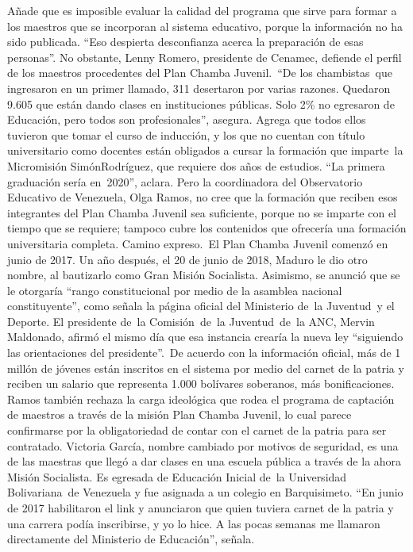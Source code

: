 \documentclass{article}%
\begin{document}
%
Añade que es imposible evaluar la calidad del programa que sirve para formar a los maestros que se incorporan al sistema educativo, porque la información no ha sido publicada. “Eso despierta desconfianza acerca la preparación de esas personas”.%
\newline%
%
No obstante, Lenny Romero, presidente de Cenamec, defiende el perfil de los maestros procedentes del Plan Chamba Juvenil.~“De los chambistas~que ingresaron en un primer llamado, 311 desertaron por varias razones. Quedaron 9.605 que están dando clases en instituciones públicas. Solo 2\% no egresaron de Educación, pero todos son profesionales”, asegura.%
\newline%
%
Agrega que todos ellos tuvieron que tomar el curso de inducción, y los que no cuentan con título universitario como docentes están obligados a cursar la formación que imparte~la Micromisión SimónRodríguez, que requiere dos años de estudios. “La primera graduación sería en~2020”, aclara.%
\newline%
%
Pero la coordinadora del Observatorio Educativo de Venezuela, Olga Ramos, no cree que la formación que reciben esos integrantes del Plan Chamba Juvenil sea suficiente, porque no se imparte con el tiempo que se requiere; tampoco cubre los contenidos que ofrecería una formación universitaria completa.%
\newline%
%
Camino expreso.~El Plan Chamba Juvenil comenzó en junio de 2017. Un año después, el 20 de junio de 2018, Maduro le dio otro nombre, al bautizarlo como Gran Misión Socialista. Asimismo, se anunció que se le otorgaría “rango constitucional por medio de la asamblea nacional constituyente”, como señala la página oficial del Ministerio de~la Juventud~y el Deporte.%
\newline%
%
El presidente de~la Comisión~de~la Juventud~de~la ANC, Mervin Maldonado, afirmó el mismo día que esa instancia crearía la nueva ley “siguiendo las orientaciones del presidente”.~De acuerdo con la información oficial, más de 1 millón de jóvenes están inscritos en el sistema por medio del carnet de la patria y reciben un salario que representa 1.000 bolívares soberanos, más bonificaciones.%
\newline%
%
Ramos también rechaza la carga ideológica que rodea el programa de captación de maestros a través de la misión Plan Chamba Juvenil, lo cual parece confirmarse por la obligatoriedad de contar con el carnet de la patria para ser contratado.%
\newline%
%
Victoria García, nombre cambiado por motivos de seguridad, es una de las maestras que llegó a dar clases en una escuela pública a través de la ahora Misión Socialista. Es egresada de Educación Inicial de~la Universidad Bolivariana~de Venezuela y fue asignada a un colegio en Barquisimeto. “En junio de 2017 habilitaron el link y anunciaron que quien tuviera carnet de la patria y una carrera podía inscribirse, y yo lo hice. A las pocas semanas me llamaron directamente del Ministerio de Educación”, señala.%
\end{document}
